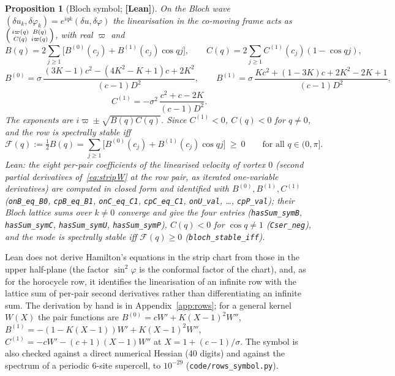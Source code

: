 \documentclass[11pt]{article}
\newtheorem{proposition}[theorem]{Proposition}
\theoremstyle{definition}
\theoremstyle{remark}
\newcommand{\st}[1]{\textbf{[#1]}}
\newcommand{\lean}[1]{\nolinkurl{#1}}
\begin{document}
\begin{proposition}[Bloch symbol; \st{Lean}]\label{prop:symbol}
On the Bloch wave $(\delta u_k,\delta\varphi_k)=e^{iqk}(\delta u,\delta\varphi)$ the linearisation in the co-moving frame acts as
$\begin{psmallmatrix}i\varpi(q)&B(q)\\C(q)&i\varpi(q)\end{psmallmatrix}$, with real $\varpi$ and
\[
B(q)=2\sum_{j\ge1}\big[B^{(0)}(c_j)+B^{(1)}(c_j)\cos qj\big],\qquad C(q)=2\sum_{j\ge1}C^{(1)}(c_j)(1-\cos qj),
\]
\[
B^{(0)}=\sigma\,\frac{(3K-1)c^2-(4K^2-K+1)c+2K^2}{(c-1)D^2},\qquad
B^{(1)}=\sigma\,\frac{Kc^2+(1-3K)c+2K^2-2K+1}{(c-1)D^2},
\]
\[
C^{(1)}=-\sigma^2\,\frac{c^2+c-2K}{(c-1)D^2}.
\]
The exponents are $i\varpi\pm\sqrt{B(q)C(q)}$. Since $C^{(1)}<0$, $C(q)<0$ for $q\ne0$, and the row is spectrally stable iff
\begin{equation}\label{eq:F}
\mathcal F(q):=\tfrac12B(q)=\sum_{j\ge1}\big[B^{(0)}(c_j)+B^{(1)}(c_j)\cos qj\big]\ \ge\ 0\qquad\text{for all }q\in(0,\pi].
\end{equation}
Lean: the eight per-pair coefficients of the linearised velocity of vortex $0$ (second partial derivatives of~\eqref{eq:stripW}
at the row pair, as iterated one-variable derivatives) are computed in closed form and identified with $B^{(0)},B^{(1)},C^{(1)}$
(\lean{onB_eq_B0}, \lean{cpB_eq_B1}, \lean{onC_eq_C1}, \lean{cpC_eq_C1}, \lean{onU_val}, \dots, \lean{cpP_val}); their Bloch lattice
sums over $k\ne0$ converge and give the four entries (\lean{hasSum_symB}, \lean{hasSum_symC}, \lean{hasSum_symU}, \lean{hasSum_symP}),
$C(q)<0$ for $\cos q\ne1$ (\lean{Cser_neg}), and the mode is spectrally stable iff $\mathcal F(q)\ge0$ (\lean{bloch_stable_iff}).
\end{proposition}
Lean does not derive Hamilton's equations in the strip chart from those in the upper half-plane (the factor $\sin^2\varphi$ is the
conformal factor of the chart), and, as for the horocycle row, it identifies the linearisation of an infinite row with the lattice
sum of per-pair second derivatives rather than differentiating an infinite sum. The derivation by hand is in Appendix~\ref{app:rows}; for a general
kernel $W(X)$ the pair functions are $B^{(0)}=cW'+K(X-1)^2W''$, $B^{(1)}=-(1-K(X-1))W'+K(X-1)^2W''$, $C^{(1)}=-cW'-(c+1)(X-1)W''$ at
$X=1+(c-1)/\sigma$. The symbol is also checked against a direct numerical Hessian (40 digits) and against the spectrum of a periodic
6-site supercell, to $10^{-29}$ (\nolinkurl{code/rows_symbol.py}).
\end{document}
